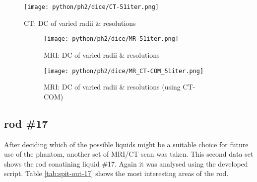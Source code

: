 \begin{figure}[!bp]
  \centering
  \texttt{[image: python/ph2/dice/CT-51iter.png]}
  \caption{CT: DC of varied radii \& resolutions}
  \label{fig:CT_dc}
\end{figure}

\begin{figure}[!tbp]
  \begin{subfigure}[b]{\textwidth}
    \centering
    \texttt{[image: python/ph2/dice/MR-51iter.png]}
    \caption{MRI: DC of varied radii \& resolutions}
    \label{fig:MR_dc-opti}
  \end{subfigure}
  \begin{subfigure}[!b]{\textwidth}
    \centering
    \texttt{[image: python/ph2/dice/MR\_CT-COM\_51iter.png]}
    \caption{MRI: DC of varied radii \& resolutions (using CT-COM)}
    \label{fig:MR_CT-COM_dc-opti}
  \end{subfigure}
  \caption{}
  \label{fig:MR_dc}
\end{figure}

\clearpage



\subsection{rod \#17}

After deciding which of the possible liquids might be a suitable choice for future use of the phantom, another set of MRI/CT scan was taken.
This second data set shows the rod conatining liquid \#17.
Again it was analysed using the developed script.
Table \ref{tab:spit-out-17} shows the most interesting areas of the rod.

